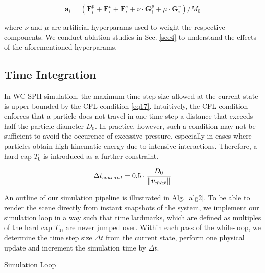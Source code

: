 \documentclass[
	11pt, 
	DIV10,
	ngerman,
	a4paper, 
	oneside, 
	headings=normal, 
	captions=tableheading,
	final, 
	numbers=noenddot
]{scrartcl}
\DeclarePairedDelimiter{\norm}{\lVert}{\rVert}
\begin{document}
\begin{equation}
	\label{eq16}
	\boldsymbol{a}_{i} = \left(\mathbf{F}_{i}^{p} + \mathbf{F}_{i}^{v} + \mathbf{F}_{i}^{e} + \nu \cdot \mathbf{G}_{i}^{p} + \mu \cdot \mathbf{G}_{i}^{v} \right) / M_{0}
\end{equation}

where $ \nu $ and $ \mu $ are artificial hyperparams used to weight the respective components. We conduct ablation studies in Sec. \ref{sec4} to understand the effects of the aforementioned hyperparams.

\subsection{Time Integration}

In WC-SPH simulation, the maximum time step size allowed at the current state is upper-bounded by the CFL condition \eqref{eq17}. Intuitively, the CFL condition enforces that a particle does not travel in one time step a distance that exceeds half the particle diameter $ D_{0} $. In practice, however, such a condition may not be sufficient to avoid the occurence of excessive pressure, especially in cases where particles obtain high kinematic energy due to intensive interactions. Therefore, a hard cap $ T_{0} $ is introduced as a further constraint.

\begin{equation}
	\label{eq17}
	\Delta t_{courant} = 0.5 \cdot \frac{D_{0}}{\norm{\boldsymbol{v}_{max}}}
\end{equation}

An outline of our simulation pipeline is illustrated in Alg. \ref{alg2}. To be able to render the scene directly from instant snapshots of the system, we implement our simulation loop in a way such that time lardmarks, which are defined as multiples of the hard cap $ T_{0} $, are never jumped over. Within each pass of the while-loop, we determine the time step size $ \Delta t $ from the current state, perform one physical update and increment the simulation time by $ \Delta t $.

\large
\begin{algorithm}
	\SetAlgoLined
	\caption{\label{alg2} Simulation Loop}
\end{algorithm}
\normalsize
\end{document}
